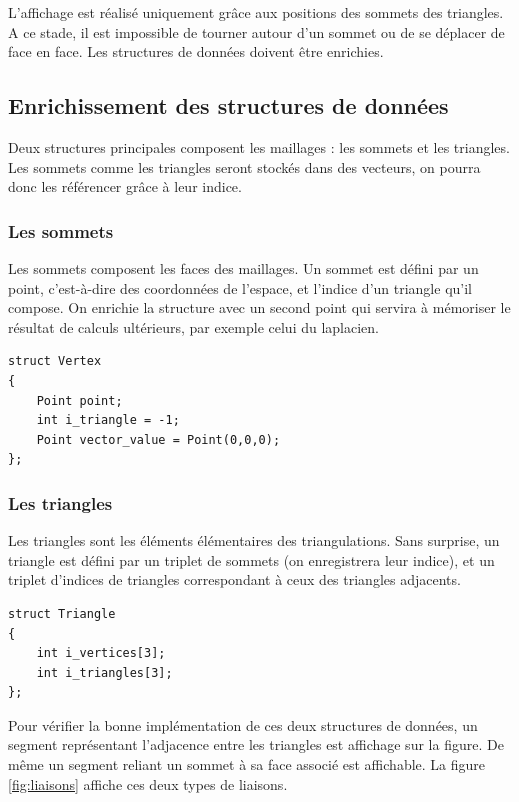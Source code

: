 \documentclass[12pt,a4paper,twoside]{report}
\begin{document}
L'affichage est réalisé uniquement grâce aux positions des sommets des triangles. A ce stade, il est impossible de tourner autour d'un sommet ou de se déplacer de face en face. Les structures de données doivent être enrichies.

\subsection{Enrichissement des structures de données}

Deux structures principales composent les maillages : les sommets et les triangles. Les sommets comme les triangles seront stockés dans des vecteurs, on pourra donc les référencer grâce à leur indice.

\subsubsection{Les sommets}

Les sommets composent les faces des maillages. Un sommet est défini par un point, c'est-à-dire des coordonnées de l'espace, et l'indice d'un triangle qu'il compose. On enrichie la structure avec un second point qui servira à mémoriser le résultat de calculs ultérieurs, par exemple celui du laplacien.

\begin{lstlisting}
struct Vertex
{
    Point point;
    int i_triangle = -1;
    Point vector_value = Point(0,0,0);
};
\end{lstlisting}

\subsubsection{Les triangles}

Les triangles sont les éléments élémentaires des triangulations. Sans surprise, un triangle est défini par un triplet de sommets (on enregistrera leur indice), et un triplet d'indices de triangles correspondant à ceux des triangles adjacents.

\begin{lstlisting}
struct Triangle
{
	int i_vertices[3];
	int i_triangles[3];  
};
\end{lstlisting}

\smallbreak
Pour vérifier la bonne implémentation de ces deux structures de données, un segment représentant l'adjacence entre les triangles est affichage sur la figure. De même un segment reliant un sommet à sa face associé est affichable. La figure \ref{fig:liaisons} affiche ces deux types de liaisons.
\end{document}
